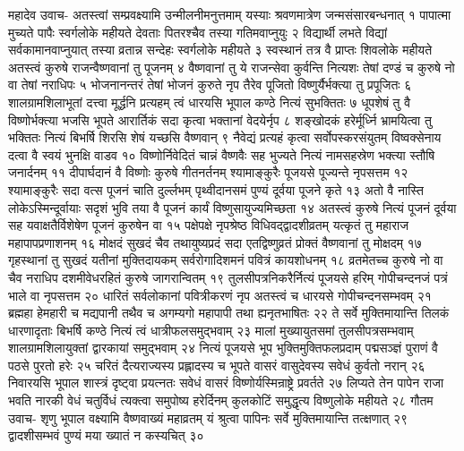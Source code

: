 
महादेव उवाच-
अतस्त्वां सम्प्रवक्ष्यामि उन्मीलनीमनुत्तमाम् 
यस्याः श्रवणमात्रेण जन्मसंसारबन्धनात् १
पापात्मा मुच्यते पापैः स्वर्गलोके महीयते 
देवताः पितरश्चैव तस्या गतिमवाप्नुयुः २
विद्यार्थी लभते विद्यां सर्वकामानवाप्नुयात् 
तस्या व्रतान्न सन्देहः स्वर्गलोके महीयते ३
स्वस्थानं तत्र वै प्राप्तः शिवलोके महीयते 
अतस्त्वं कुरुषे राजन्वैष्णवानां तु पूजनम् ४
वैष्णवानां तु ये राजन्सेवा कुर्वन्ति नित्यशः 
तेषां दण्डं च कुरुषे नो वा तेषां नराधिपः ५
भोजनानन्तरं तेषां भोजनं कुरुते नृप 
तैरेव पूजितो विष्णुर्यैर्भक्त्या तु प्रपूजितः ६
शालग्रामशिलाभूतां दत्त्वा मूर्द्धनि प्रत्यहम् 
त्वं धारयसि भूपाल कण्ठे नित्यं सुभक्तितः ७
धूपशेषं तु वै विष्णोर्भक्त्या भजसि भूपते 
आरार्तिकं सदा कृत्वा भक्तानां वेदयेर्नृप ८
शङ्खोदकं हरेर्मूर्ध्नि भ्रामयित्वा तु भक्तितः 
नित्यं बिभर्षि शिरसि शेषं यच्छसि वैष्णवान् ९
नैवेद्यं प्रत्यहं कृत्वा सर्वोपस्करसंयुतम् 
विष्वक्सेनाय दत्वा वै स्वयं भुनक्षि वाडव १०
विष्णोर्निवेदितं चान्नं वैष्णवैः सह भुज्यते 
नित्यं नामसहस्रेण भक्त्या स्तौषि जनार्दनम् ११
दीपार्घदानं वै विष्णोः कुरुषे गीतनर्तनम् 
श्यामाङ्कुरैः पूजयसे पूज्यन्ते नृपसत्तम १२
श्यामाङ्कुरैः सदा वत्स पूजनं चाति दुर्ल्लभम् 
पृथ्वीदानसमं पुण्यं दूर्वया पूजने कृते १३
अतो वै नास्ति लोकेऽस्मिन्दूर्वायाः सदृशं भुवि 
तया वै पूजनं कार्यं विष्णुसायुज्यमिच्छता १४
अतस्त्वं कुरुषे नित्यं पूजनं दूर्वया सह 
यवाक्षतैर्विशेषेण पूजनं कुरुषेन वा १५
पक्षेपक्षे नृपश्रेष्ठ विधिवद्द्वादशीव्रतम् 
यत्कृतं तु महाराज महापापप्रणाशनम् १६
मोक्षदं सुखदं चैव तथायुष्यप्रदं सदा 
एतद्विष्णुव्रतं प्रोक्तं वैष्णवानां तु मोक्षदम् १७
गृहस्थानां तु सुखदं यतीनां मुक्तिदायकम् 
सर्वरोगादिशमनं पवित्रं कायशोधनम् १८
व्रतमेतच्च कुरुषे नो वा चैव नराधिप 
दशमीवेधरहितं कुरुषे जागरान्वितम् १९
तुलसीपत्रनिकरैर्नित्यं पूजयसे हरिम् 
गोपीचन्दनजं पत्रं भाले वा नृपसत्तम २०
धारितं सर्वलोकानां पवित्रीकरणं नृप 
अतस्त्वं च धारयसे गोपीचन्दनसम्भवम् २१
ब्रह्महा हेमहारी च मद्यपानी तथैव च 
अगम्यगो महापापी तथा ह्यनृतभाषितः २२
ते सर्वे मुक्तिमायान्ति तिलकं धारणादृताः 
बिभर्षि कण्ठे नित्यं त्वं धात्रीफलसमुद्भवाम् २३
मालां मुख्यायुतसमां तुलसीपत्रसम्भवाम् 
शालग्रामशिलायुक्तां द्वारकायां समुद्भवाम् २४
नित्यं पूजयसे भूप भुक्तिमुक्तिफलप्रदाम् 
पद्मसञ्ज्ञं पुराणं वै पठसे पुरतो हरेः २५
चरितं दैत्यराज्यस्य प्रह्लादस्य च भूपते 
वासरं वासुदेवस्य सवेधं कुर्वतो नरान् २६
निवारयसि भूपाल शास्त्रं दृष्ट्वा प्रयत्नतः 
सवेधं वासरं विष्णोर्यस्मिन्राष्ट्रे प्रवर्तते २७
लिप्यते तेन पापेन राजा भवति नारकी 
वेधं चतुर्विधं त्यक्त्वा समुपोष्य हरेर्दिनम् 
कुलकोटिं समुद्धृत्य विष्णुलोके महीयते २८
गौतम उवाच-
शृणु भूपाल वक्ष्यामि वैष्णवाख्यं महाव्रतम् 
यं श्रुत्वा पापिनः सर्वे मुक्तिमायान्ति तत्क्षणात् २९
द्वादशीसम्भवं पुण्यं मया ख्यातं न कस्यचित् ३०
